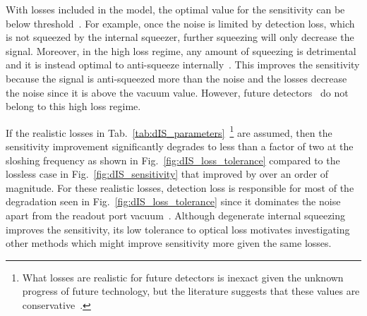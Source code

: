 With losses included in the model, the optimal value for the sensitivity can be below threshold~\cite{korobkoCompensatingQuantumDecoherenceTalk2021}. For example, once the noise is limited by detection loss, which is not squeezed by the internal squeezer, further squeezing will only decrease the signal. Moreover, in the high loss regime, any amount of squeezing is detrimental and it is instead optimal to anti-squeeze internally~\cite{korobkoCompensatingQuantumDecoherenceTalk2021}. This improves the sensitivity because the signal is anti-squeezed more than the noise and the losses decrease the noise since it is above the vacuum value. However, future detectors~\cite{} do not belong to this high loss regime. %


If the realistic losses in Tab.~\ref{tab:dIS_parameters}~\footnote{What losses are realistic for future detectors is inexact given the unknown progress of future technology, but the literature suggests that these values are conservative~\cite{zhangBroadbandSignalRecycling2021,}.} are assumed, then the sensitivity improvement significantly degrades to less than a factor of two at the sloshing frequency as shown in Fig.~\ref{fig:dIS_loss_tolerance} compared to the lossless case in Fig.~\ref{fig:dIS_sensitivity} that improved by over an order of magnitude. For these realistic losses, detection loss is responsible for most of the degradation seen in Fig.~\ref{fig:dIS_loss_tolerance} since it dominates the noise apart from the readout port vacuum~\cite{}. %
Although degenerate internal squeezing improves the sensitivity, its low tolerance to optical loss motivates investigating other methods which might improve sensitivity more given the same losses. 



